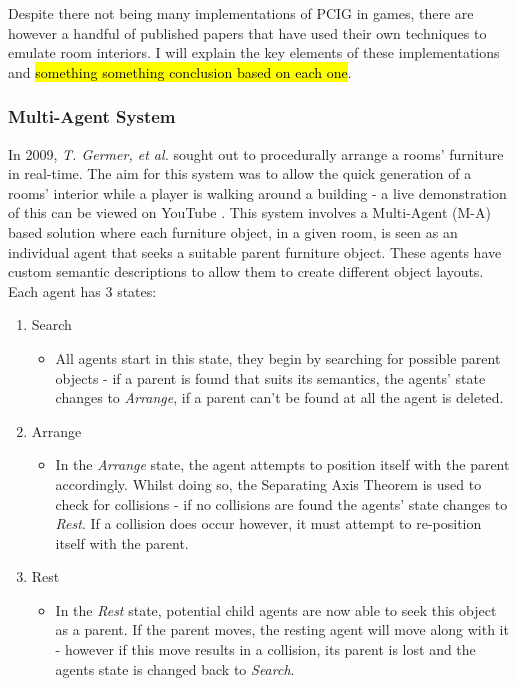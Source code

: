 \bigskip
Despite there not being many implementations of PCIG in games, there are however a handful of published papers that have used their own techniques to emulate room interiors. I will explain the key elements of these implementations and \hl{something something conclusion based on each one}.

\bigskip
\subsubsection{Multi-Agent System}
In 2009, \textit{T. Germer, et al.} \cite{real-time-walkthroughs} sought out to procedurally arrange a rooms' furniture in real-time. 
The aim for this system was to allow the quick generation of a rooms' interior while a player is walking around a building - a live demonstration of this can be viewed on YouTube \cite{youtube:real-time-walkthroughs}.
This system involves a Multi-Agent (M-A) based solution where each furniture object, in a given room, is seen as an individual agent that seeks a suitable parent furniture object. These agents have custom semantic descriptions to allow them to create different object layouts. %
Each agent has 3 states:
\begin{enumerate}
    \item Search
        \begin{itemize}
            \item All agents start in this state, they begin by searching for possible parent objects - if a parent is found that suits its semantics, the agents' state changes to \textit{Arrange}, if a parent can't be found at all the agent is deleted.
        \end{itemize}
    \item Arrange
        \begin{itemize}
            \item In the \textit{Arrange} state, the agent attempts to position itself with the parent accordingly. Whilst doing so, the Separating Axis Theorem \cite{separating-axis-thereom} is used to check for collisions - if no collisions are found the agents' state changes to \textit{Rest}. If a collision does occur however, it must attempt to re-position itself with the parent.
        \end{itemize}
    \item Rest
        \begin{itemize}
            \item In the \textit{Rest} state, potential child agents are now able to seek this object as a parent. If the parent moves, the resting agent will move along with it - however if this move results in a collision, its parent is lost and the agents state is changed back to \textit{Search}.
        \end{itemize}
\end{enumerate}

